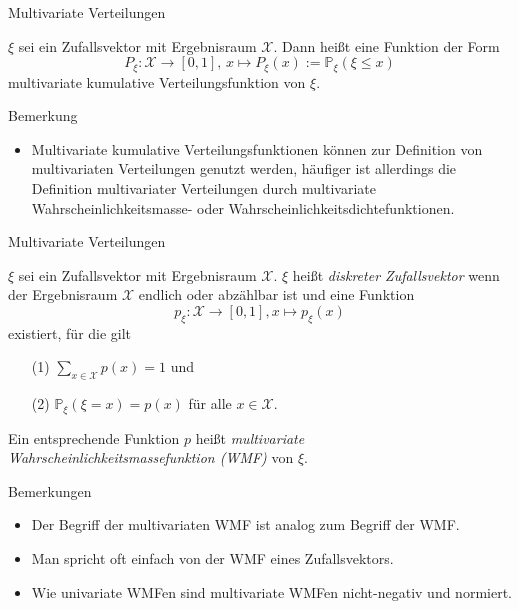 \documentclass[
  8pt,
  ignorenonframetext,
]{beamer}
\providecommand{\tightlist}{%
  \setlength{\itemsep}{0pt}\setlength{\parskip}{0pt}}
\begin{document}
\begin{frame}{Multivariate Verteilungen}
\protect\hypertarget{multivariate-verteilungen-1}{}
\small
\begin{definition}
$\xi$ sei ein Zufallsvektor mit Ergebnisraum $\mathcal{X}$. Dann heißt eine Funktion
der Form
\begin{equation}
P_\xi : \mathcal{X} \to [0,1],\, x \mapsto P_\xi(x) := \mathbb{P}_\xi(\xi \le x)
\end{equation}
multivariate kumulative Verteilungsfunktion von $\xi$.
\end{definition}

Bemerkung

\begin{itemize}
\tightlist
\item
  \justifying Multivariate kumulative Verteilungsfunktionen können zur
  Definition von multivariaten Verteilungen genutzt werden, häufiger ist
  allerdings die Definition multivariater Verteilungen durch
  multivariate Wahrscheinlichkeitsmasse- oder
  Wahrscheinlichkeitsdichtefunktionen.
\end{itemize}
\end{frame}

\begin{frame}{Multivariate Verteilungen}
\protect\hypertarget{multivariate-verteilungen-2}{}
\small
\begin{definition}
\justifying
$\xi$ sei ein Zufallsvektor mit Ergebnisraum $\mathcal{X}$. $\xi$ heißt 
\textit{diskreter Zufallsvektor} wenn der Ergebnisraum $\mathcal{X}$ endlich oder
abzählbar ist und eine Funktion 
\begin{equation}
p_\xi : \mathcal{X} \to [0,1], x \mapsto p_\xi(x)  
\end{equation}
existiert, für die gilt
\begin{itemize}
\item[(1)] $\sum_{x \in \mathcal{X}}p(x) = 1$ und
\item[(2)] $\mathbb{P}_\xi(\xi = x) = p(x)$ für alle $x \in \mathcal{X}$.
\end{itemize}
Ein entsprechende Funktion $p$ heißt \textit{multivariate Wahrscheinlichkeitsmassefunktion (WMF)} von $\xi$.
\end{definition}

Bemerkungen

\begin{itemize}
\tightlist
\item
  Der Begriff der multivariaten WMF ist analog zum Begriff der WMF.
\item
  Man spricht oft einfach von der WMF eines Zufallsvektors.
\item
  Wie univariate WMFen sind multivariate WMFen nicht-negativ und
  normiert.
\end{itemize}
\end{frame}
\end{document}
